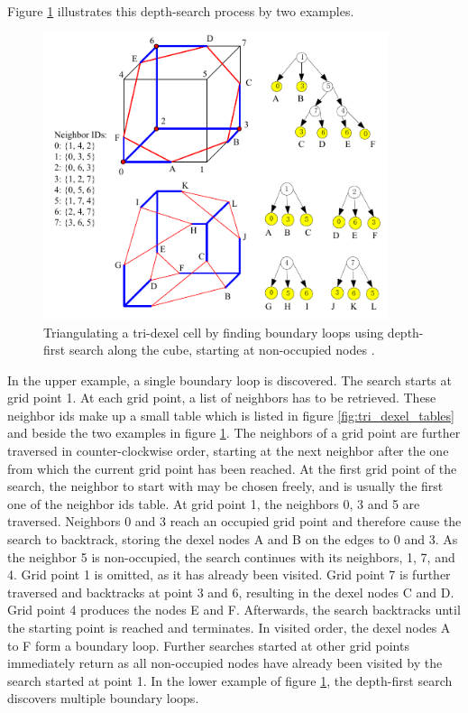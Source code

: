 Figure \ref{fig:tri_dexel_triangulation} illustrates this depth-search process by two examples.
%
\begin{figure}
	\centering
	\includegraphics[width=0.9\textwidth]{images/tri_dexel_triangulation}
	\caption{
		Triangulating a tri-dexel cell by finding boundary loops using depth-first search along the cube, starting at non-occupied nodes \cite{tridexel_reconstruction}.
	}
	\label{fig:tri_dexel_triangulation}
\end{figure}
%
In the upper example, a single boundary loop is discovered.
The search starts at grid point 1.
At each grid point, a list of neighbors has to be retrieved.
These neighbor ids make up a small table which is listed in figure \ref{fig:tri_dexel_tables} and beside the two examples in figure \ref{fig:tri_dexel_triangulation}.
The neighbors of a grid point are further traversed in counter-clockwise order, starting at the next neighbor after the one from which the current grid point has been reached.
At the first grid point of the search, the neighbor to start with may be chosen freely, and is usually the first one of the neighbor ids table.
At grid point 1, the neighbors 0, 3 and 5 are traversed.
Neighbors 0 and 3 reach an occupied grid point and therefore cause the search to backtrack, storing the dexel nodes A and B on the edges to 0 and 3.
As the neighbor 5 is non-occupied, the search continues with its neighbors, 1, 7, and 4.
Grid point 1 is omitted, as it has already been visited.
Grid point 7 is further traversed and backtracks at point 3 and 6, resulting in the dexel nodes C and D.
Grid point 4 produces the nodes E and F.
Afterwards, the search backtracks until the starting point is reached and terminates.
In visited order, the dexel nodes A to F form a boundary loop.
Further searches started at other grid points immediately return as all non-occupied nodes have already been visited by the search started at point 1.
%
In the lower example of figure \ref{fig:tri_dexel_triangulation}, the depth-first search discovers multiple boundary loops.

